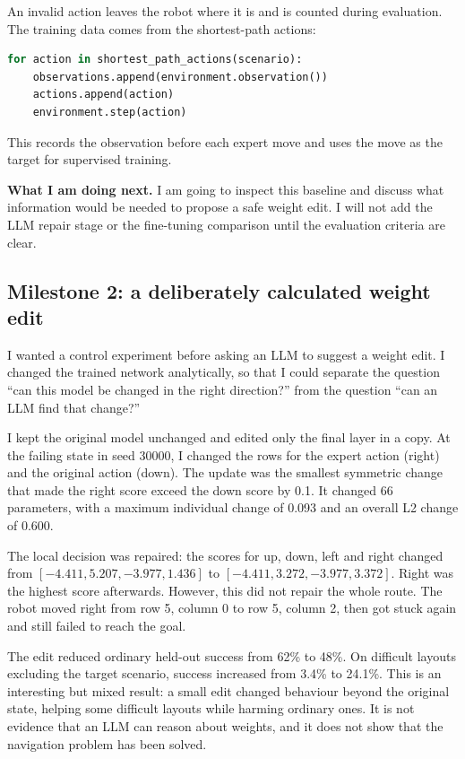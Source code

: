 \documentclass[11pt,a4paper]{article}
\begin{document}
An invalid action leaves the robot where it is and is counted during evaluation. The training data comes from the shortest-path actions:

\begin{lstlisting}[language=Python]
for action in shortest_path_actions(scenario):
    observations.append(environment.observation())
    actions.append(action)
    environment.step(action)
\end{lstlisting}

This records the observation before each expert move and uses the move as the target for supervised training.

\textbf{What I am doing next.}
I am going to inspect this baseline and discuss what information would be needed to propose a safe weight edit. I will not add the LLM repair stage or the fine-tuning comparison until the evaluation criteria are clear.

\subsection*{Milestone 2: a deliberately calculated weight edit}

I wanted a control experiment before asking an LLM to suggest a weight edit. I changed the trained network analytically, so that I could separate the question ``can this model be changed in the right direction?'' from the question ``can an LLM find that change?''

I kept the original model unchanged and edited only the final layer in a copy. At the failing state in seed 30000, I changed the rows for the expert action (right) and the original action (down). The update was the smallest symmetric change that made the right score exceed the down score by 0.1. It changed 66 parameters, with a maximum individual change of 0.093 and an overall L2 change of 0.600.

The local decision was repaired: the scores for up, down, left and right changed from $[-4.411, 5.207, -3.977, 1.436]$ to $[-4.411, 3.272, -3.977, 3.372]$. Right was the highest score afterwards. However, this did not repair the whole route. The robot moved right from row 5, column 0 to row 5, column 2, then got stuck again and still failed to reach the goal.

The edit reduced ordinary held-out success from 62\% to 48\%. On difficult layouts excluding the target scenario, success increased from 3.4\% to 24.1\%. This is an interesting but mixed result: a small edit changed behaviour beyond the original state, helping some difficult layouts while harming ordinary ones. It is not evidence that an LLM can reason about weights, and it does not show that the navigation problem has been solved.
\end{document}
